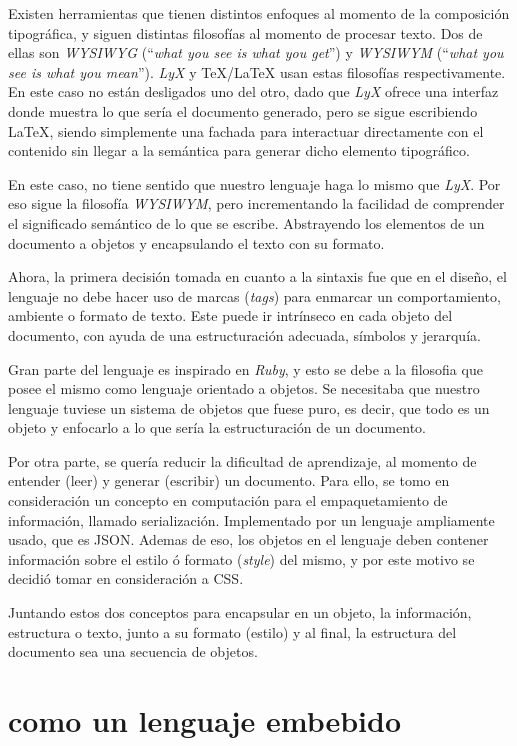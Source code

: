 \documentclass[12pt,letterpaper,titlepage,oneside,openright]{book}
\newcommand{\OhTeX}{%
    \makebox[0.76em][c]{O}%
    \makebox[0.25em][c]{%
        \raisebox{0.14em}[0em][0em]{%
            \fontsize{0.5em}{0cm}%
                \selectfont H%
        }%
    }%
    \makebox[1.35em][c]{\TeX}%
}
\newcommand{\latex}{\LaTeX\xspace}
\newcommand{\tex}{\TeX\xspace}
\newcommand{\ohtex}{\OhTeX\xspace}
\newcommand{\ruby}{\textit{Ruby}\xspace}
\newcommand{\lyx}{\textit{LyX}\xspace}
\begin{document}
Existen herramientas que tienen distintos enfoques al momento de la composición
tipográfica, y siguen distintas filosofías al momento de procesar texto. Dos de
ellas son \textit{WYSIWYG} (``\textit{what you see is what you get}'') y
\textit{WYSIWYM} (``\textit{what you see is what you mean}''). \lyx y 
\tex/\latex usan estas filosofías respectivamente. En este caso no están
desligados uno del otro, dado que \lyx ofrece una interfaz donde muestra lo que
sería el documento generado, pero se sigue escribiendo \latex, siendo
simplemente una fachada para interactuar directamente con el contenido sin
llegar a la semántica para generar dicho elemento tipográfico.

En este caso, no tiene sentido que nuestro lenguaje haga lo mismo que
\lyx. Por eso sigue la filosofía \textit{WYSIWYM}, pero incrementando la
facilidad de comprender el significado semántico de lo que se escribe.
Abstrayendo los elementos de un documento a objetos y encapsulando el texto con
su formato.

Ahora, la primera decisión tomada en cuanto a la sintaxis fue que en el diseño,
el lenguaje no debe hacer uso de marcas (\textit{tags}) para enmarcar un
comportamiento, ambiente o formato de texto. Este puede ir intrínseco en cada
objeto del documento, con ayuda de una estructuración adecuada, símbolos y
jerarquía.

Gran parte del lenguaje es inspirado en \ruby, y esto se debe a la filosofia que
posee el mismo como lenguaje orientado a objetos. Se necesitaba que nuestro
lenguaje tuviese un sistema de objetos que fuese puro, es decir, que todo es un
objeto y enfocarlo a lo que sería la estructuración de un documento.

Por otra parte, se quería reducir la dificultad de aprendizaje, al momento de
entender (leer) y generar (escribir) un documento. Para ello, se tomo en
consideración un concepto en computación para el empaquetamiento de información,
llamado serialización. Implementado por un lenguaje ampliamente usado, que es
JSON. Ademas de eso, los objetos en el lenguaje deben contener información sobre
el estilo ó formato (\textit{style}) del mismo, y por este motivo se decidió
tomar en consideración a CSS.

Juntando estos dos conceptos para encapsular en un objeto, la información,
estructura o texto, junto a su formato (estilo) y al final, la estructura del
documento sea una secuencia de objetos.

\section[OhTeX como un lenguaje embebido]{\ohtex como un lenguaje embebido}
\end{document}
